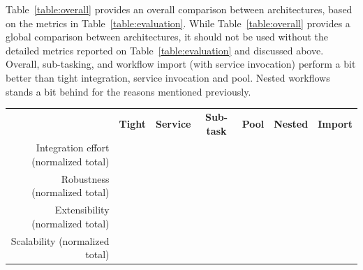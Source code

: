 \documentclass[preprint,3p,twocolumn]{elsarticle}
\begin{document}
Table~\ref{table:overall} provides an overall comparison between
architectures, based on the metrics in
Table~\ref{table:evaluation}. While Table~\ref{table:overall} provides
a global comparison between architectures, it should not be used
without the detailed metrics reported on Table~\ref{table:evaluation}
and discussed above. Overall, sub-tasking, and workflow import (with
service invocation) perform a bit better than tight integration,
service invocation and pool. Nested workflows stands a bit behind for
the reasons mentioned previously.
\begin{table}
\centering
\begin{tabular}{rcccccc}
                                    & \textbf{Tight}
                                    & \textbf{Service}
                                    & \textbf{Sub-task}
                                    & \textbf{Pool}
                                    & \textbf{Nested}
                                    & \textbf{Import} \\
  Integration effort (normalized total) & 
                                    \cellcolor[HTML]{99FF99}{0.00}
                                    & \cellcolor[HTML]{99EF99}{0.22}
                                    & \cellcolor[HTML]{99FF99}{0.00}
                                    & \cellcolor[HTML]{99E099}{0.44}
                                    & \cellcolor[HTML]{99BB99}{1.00}
                                      & \cellcolor[HTML]{99E899}{0.33}\\                           
Robustness (normalized total) & 
                                \cellcolor[HTML]{99F599}{0.14}
                                    & \cellcolor[HTML]{99E199}{0.43}
                                    & \cellcolor[HTML]{99FF99}{0.00}
                                    & \cellcolor[HTML]{99CE99}{0.71}
                                    & \cellcolor[HTML]{99BB99}{1.00}
                                    & \cellcolor[HTML]{99E199}{0.43}\\
  Extensibility (normalized total)  & \cellcolor[HTML]{99E099}{0.44}
                                     & \cellcolor[HTML]{99E099}{0.44}
                                     & \cellcolor[HTML]{99FF99}{0.00}
                                     & \cellcolor[HTML]{99EF99}{0.22}
                                     & \cellcolor[HTML]{99BB99}{1.00}
                                     & \cellcolor[HTML]{99EF99}{0.22}\\
Scalability (normalized total)  & \cellcolor[HTML]{99BB99}{1.00}
                                     & \cellcolor[HTML]{99DD99}{0.50}

\end{tabular}
\end{table}
\end{document}

